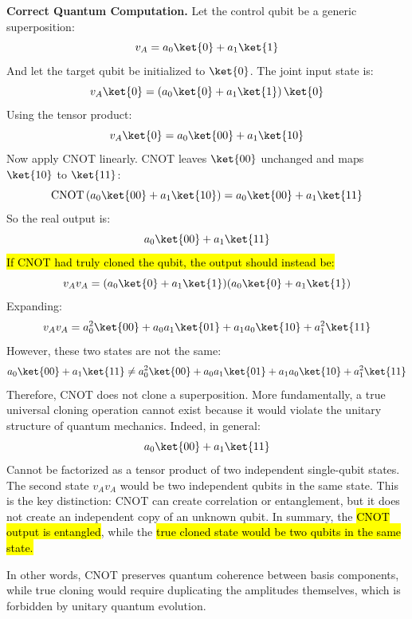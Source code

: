 \highspace
\textcolor{Green3}{ \textbf{Correct Quantum Computation.}} Let the control qubit be a generic superposition:
\begin{equation*}
    v_A = a_0\ket{0}+a_1\ket{1}
\end{equation*}
And let the target qubit be initialized to $\ket{0}$. The joint input state is:
\begin{equation*}
    v_A\ket{0}
    =
    \left( a_0\ket{0} + a_1\ket{1} \right) \ket{0}
\end{equation*}
Using the tensor product:
\begin{equation*}
    v_A\ket{0}
    =
    a_0\ket{00} + a_1\ket{10}
\end{equation*}
Now apply CNOT linearly. CNOT leaves $\ket{00}$ unchanged and maps $\ket{10}$ to $\ket{11}$:
\begin{equation*}
    \text{CNOT}\left(a_0\ket{00}+a_1\ket{10}\right)
    =
    a_0\ket{00}+a_1\ket{11}
\end{equation*}
So the real output is:
\begin{equation*}
    a_0\ket{00}+a_1\ket{11}
\end{equation*}
\hl{If CNOT had truly cloned the qubit, the output should instead be:}
\begin{equation*}
    v_Av_A
    =
    (a_0\ket{0}+a_1\ket{1})(a_0\ket{0}+a_1\ket{1})
\end{equation*}
Expanding:
\begin{equation*}
    v_Av_A
    =
    a_0^2\ket{00}
    +
    a_0a_1\ket{01}
    +
    a_1a_0\ket{10}
    +
    a_1^2\ket{11}    
\end{equation*}
However, these two states are not the same:
\begin{equation*}
    a_0\ket{00}+a_1\ket{11}
    \neq
    a_0^2\ket{00}
    +
    a_0a_1\ket{01}
    +
    a_1a_0\ket{10}
    +
    a_1^2\ket{11}
\end{equation*}
Therefore, CNOT does not clone a superposition. More fundamentally, a true universal cloning operation cannot exist because it would violate the unitary structure of quantum mechanics. Indeed, in general:
\begin{equation*}
    a_0\ket{00}+a_1\ket{11}
\end{equation*}
Cannot be factorized as a tensor product of two independent single-qubit states. The second state $v_Av_A$ would be two independent qubits in the same state. This is the key distinction: CNOT can create correlation or entanglement, but it does not create an independent copy of an unknown qubit. In summary, the \hl{CNOT output is entangled}, while the \hl{true cloned state would be two qubits in the same state.}

\highspace
In other words, CNOT preserves quantum coherence between basis components, while true cloning would require duplicating the amplitudes themselves, which is forbidden by unitary quantum evolution.